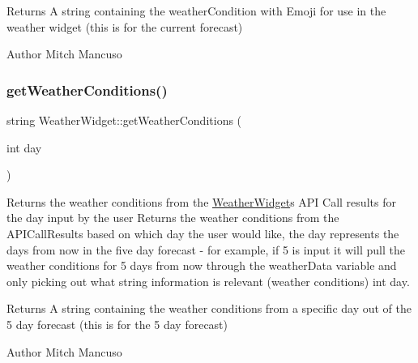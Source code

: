 \begin{DoxyReturn}{Returns}
A string containing the weather\+Condition with Emoji for use in the weather widget (this is for the current forecast) 
\end{DoxyReturn}
\begin{DoxyAuthor}{Author}
Mitch Mancuso 
\end{DoxyAuthor}
\mbox{\label{class_weather_widget_a2d1c33c6a51b5f2bf28cbcb6487007c8}} 
\subsubsection{\texorpdfstring{get\+Weather\+Conditions()}{getWeatherConditions()}}
{\footnotesize\ttfamily string Weather\+Widget\+::get\+Weather\+Conditions (\begin{DoxyParamCaption}\item[{int}]{day }\end{DoxyParamCaption})}



Returns the weather conditions from the \mbox{\hyperlink{class_weather_widget}{Weather\+Widget}}\textquotesingle{}s A\+PI Call results for the day input by the user  Returns the weather conditions from the A\+P\+I\+Call\+Results based on which day the user would like, the day represents the days from now in the five day forecast -\/ for example, if 5 is input it will pull the weather conditions for 5 days from now through the weather\+Data variable and only picking out what string information is relevant (weather conditions)  int day. 

\begin{DoxyReturn}{Returns}
A string containing the weather conditions from a specific day out of the 5 day forecast (this is for the 5 day forecast) 
\end{DoxyReturn}
\begin{DoxyAuthor}{Author}
Mitch Mancuso 
\end{DoxyAuthor}
\mbox{\label{class_weather_widget_a2ce2729ca424ece9ad9eff074d76f5a1}} 
